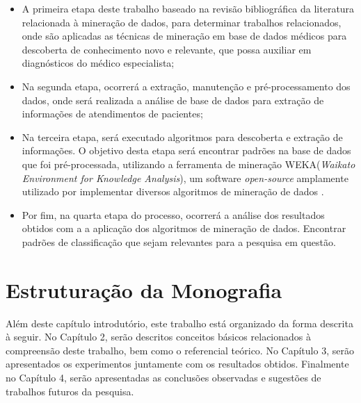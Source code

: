 \documentclass[
	12pt,				%
	openright,			%
	oneside,	
	a4paper,				%
	english,				%
	brazil				%
]{abntex2/abntex2} %
\begin{document}
		\begin{itemize}
			
			\item A primeira etapa deste trabalho baseado na revisão bibliográfica da literatura relacionada à mineração de dados, para determinar trabalhos relacionados, onde são aplicadas as técnicas de mineração em base de dados médicos para descoberta de conhecimento novo e relevante, que possa auxiliar em diagnósticos do médico especialista;
			
			\item Na segunda etapa, ocorrerá a extração, manutenção e pré-processamento dos dados, onde será realizada a análise  de base de dados para extração de informações de atendimentos de pacientes;
			
			\item Na terceira etapa, será executado algoritmos para descoberta e extração de informações. O objetivo desta etapa será encontrar padrões na base de dados que foi pré-processada, utilizando a ferramenta de mineração WEKA(\textit{Waikato Environment for Knowledge Analysis}), um software \textit{open-source} \cite{opensource:2015} amplamente utilizado por implementar diversos algoritmos de mineração de dados \cite{hall:2009}.
			
			
			\item Por fim,  na quarta etapa do processo, ocorrerá a análise dos resultados obtidos com a a aplicação dos algoritmos de mineração de dados. Encontrar padrões de classificação que sejam relevantes para a pesquisa em questão.
			
		\end{itemize}
	
	\section{Estruturação da Monografia}
	
		Além deste capítulo introdutório, este trabalho está organizado da forma descrita à seguir. No Capítulo 2, serão descritos conceitos básicos relacionados à compreensão deste trabalho, bem como o referencial teórico. No Capítulo 3, serão apresentados os experimentos juntamente com os resultados obtidos. Finalmente no Capítulo 4, serão apresentadas as conclusões observadas e sugestões de trabalhos futuros da pesquisa.
\end{document}
